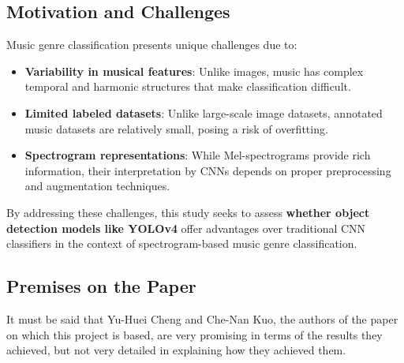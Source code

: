 \documentclass[a4paper,12pt]{article}
\begin{document}
\subsection{Motivation and Challenges}
Music genre classification presents unique challenges due to:
\begin{itemize}
    \item \textbf{Variability in musical features}: Unlike images, music has complex temporal and harmonic structures that make classification difficult.
    \item \textbf{Limited labeled datasets}: Unlike large-scale image datasets, annotated music datasets are relatively small, posing a risk of overfitting.
    \item \textbf{Spectrogram representations}: While Mel-spectrograms provide rich information, their interpretation by CNNs depends on proper preprocessing and augmentation techniques.
\end{itemize}
By addressing these challenges, this study seeks to assess \textbf{whether object detection models like YOLOv4} offer advantages over traditional CNN classifiers in the context of spectrogram-based music genre classification.



\subsection{Premises on the Paper}
It must be said that Yu-Huei Cheng and Che-Nan Kuo, the authors of the paper on which this project is based, are very promising in terms of the results they achieved, but not very detailed in explaining how they achieved them.
\end{document}
